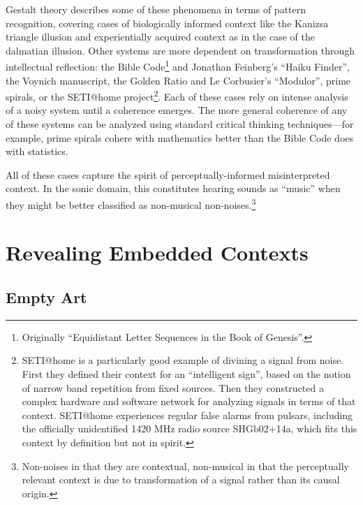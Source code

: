 \documentclass{thesis}
\begin{document}
Gestalt theory describes some of these phenomena in terms of pattern recognition, covering cases of biologically informed context like the Kanizsa triangle illusion\cite{alexander_bogomolny_kanizsa_????} and experientially acquired context as in the case of the dalmatian illusion\cite{michael_bach_dalmatian_2002}. Other systems are more dependent on transformation through intellectual reflection: the Bible Code\footnote{Originally ``Equidistant Letter Sequences in the Book of Genesis''\cite{rips_equidistant_1994}.} and Jonathan Feinberg's ``Haiku Finder'', the Voynich manuscript\cite{robin_mckie_secret_2004}, the Golden Ratio\cite{Doczi81}\cite{markowsky_misconceptions_1992} and Le Corbusier's ``Modulor''\cite{padovan_proportion_1999}, prime spirals\cite{michael_m._ross_natural_2007}\cite{weisstein_prime_????}, or the SETI@home project\cite{seti_about_????}\footnote{SETI@home is a particularly good example of divining a signal from noise. First they defined their context for an ``intelligent sign'', based on the notion of narrow band repetition from fixed sources. Then they constructed a complex hardware and software network for analyzing signals in terms of that context. SETI@home experiences regular false alarms from pulsars, including the officially unidentified 1420 MHz radio source SHGb02+14a\cite{eugenie_samuel_reich_mysterious_2004}, which fits this context by definition but not in spirit.}. Each of these cases rely on intense analysis of a noisy system until a coherence emerges. The more general coherence of any of these systems can be analyzed using standard critical thinking techniques\cite{Moore07}---for example, prime spirals cohere with mathematics better than the Bible Code does with statistics.

All of these cases capture the spirit of perceptually-informed misinterpreted context. In the sonic domain, this constitutes hearing sounds as ``music'' when they might be better classified as non-musical non-noises.\footnote{Non-noises in that they are contextual, non-musical in that the perceptually relevant context is due to transformation of a signal rather than its causal origin.}

\chapter{Revealing Embedded Contexts}

\section{Empty Art}
\end{document}
